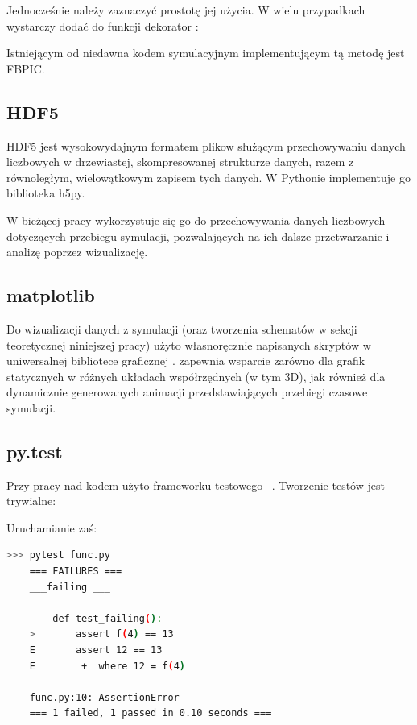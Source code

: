 Jednocześnie należy zaznaczyć prostotę jej użycia. W wielu przypadkach wystarczy
dodać do funkcji dekorator :

\label{lst:numba}

Istniejącym od niedawna kodem symulacyjnym implementującym tą metodę jest FBPIC\cite{fbpic}.


\subsection{HDF5}
HDF5 jest wysokowydajnym formatem plikow służącym przechowywaniu danych
liczbowych w drzewiastej, skompresowanej strukturze danych, razem z
równoległym, wielowątkowym zapisem tych danych.  W Pythonie implementuje go
biblioteka h5py\cite{h5py}.

W bieżącej pracy wykorzystuje się go do przechowywania danych liczbowych
dotyczących przebiegu symulacji, pozwalających na ich dalsze przetwarzanie
i analizę poprzez wizualizację.

\subsection{matplotlib}
Do wizualizacji danych z symulacji (oraz tworzenia schematów w sekcji
teoretycznej niniejszej pracy) użyto własnoręcznie napisanych skryptów w
uniwersalnej bibliotece graficznej \cite{matplotlib}.
 zapewnia wsparcie zarówno dla grafik statycznych w różnych układach
współrzędnych (w tym 3D), jak również dla dynamicznie generowanych animacji
przedstawiających przebiegi czasowe symulacji.

\subsection{py.test}\label{sec:pytest}
Przy pracy nad kodem użyto frameworku testowego ~\cite{pytest}.
Tworzenie testów jest trywialne:



Uruchamianie zaś:

\begin{lstlisting}[language=Bash]
    >>> pytest func.py
    === FAILURES ===
    ___failing ___

        def test_failing():
    >       assert f(4) == 13
    E       assert 12 == 13
    E        +  where 12 = f(4)

    func.py:10: AssertionError
    === 1 failed, 1 passed in 0.10 seconds ===
\end{lstlisting}

